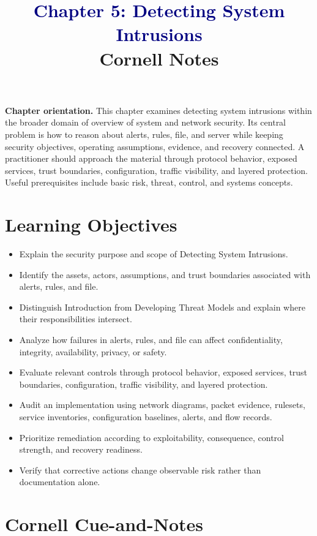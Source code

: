 \documentclass[11pt]{article}
\title{\textcolor{Navy}{Chapter 5: Detecting System Intrusions}\\[2mm]\large Cornell Notes}
\author{}
\date{}
\begin{document}
\maketitle
\thispagestyle{fancy}
\vspace{-1.5em}
\begin{orientationbox}
\textbf{Chapter orientation.} This chapter examines detecting system intrusions within the broader domain of overview of system and network security. Its central problem is how to reason about alerts, rules, file, and server while keeping security objectives, operating assumptions, evidence, and recovery connected. A practitioner should approach the material through protocol behavior, exposed services, trust boundaries, configuration, traffic visibility, and layered protection. Useful prerequisites include basic risk, threat, control, and systems concepts.
\end{orientationbox}
\section*{Learning Objectives}
\begin{itemize}
\item Explain the security purpose and scope of Detecting System Intrusions.
\item Identify the assets, actors, assumptions, and trust boundaries associated with alerts, rules, and file.
\item Distinguish Introduction from Developing Threat Models and explain where their responsibilities intersect.
\item Analyze how failures in alerts, rules, and file can affect confidentiality, integrity, availability, privacy, or safety.
\item Evaluate relevant controls through protocol behavior, exposed services, trust boundaries, configuration, traffic visibility, and layered protection.
\item Audit an implementation using network diagrams, packet evidence, rulesets, service inventories, configuration baselines, alerts, and flow records.
\item Prioritize remediation according to exploitability, consequence, control strength, and recovery readiness.
\item Verify that corrective actions change observable risk rather than documentation alone.
\end{itemize}
\section*{Cornell Cue-and-Notes}
\end{document}
